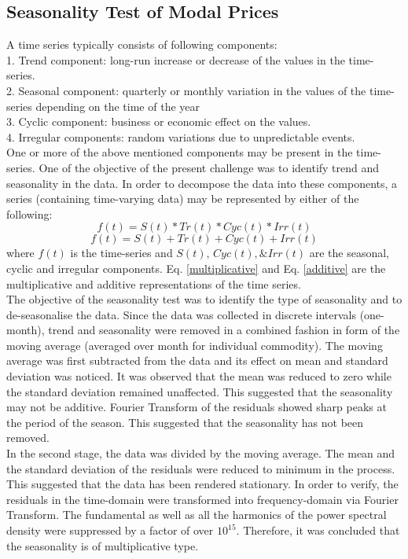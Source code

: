\documentclass{article}
\begin{document}
\subsection{Seasonality Test of Modal Prices}
A time series typically consists of following components: \\
1. Trend component: long-run increase or decrease of the values in the time-series. \\
2. Seasonal component: quarterly or monthly variation in the values of the time-series depending on the time of the year \\
3. Cyclic component: business or economic effect on the values.  \\
4. Irregular components: random variations due to unpredictable events. \\
One or more of the above mentioned components may be present in the time-series. One of the objective of the present challenge was to identify trend and seasonality in the data. In order to decompose the data into these components, a series (containing time-varying data) may be represented by either of the following: \\
\begin{equation}\label{multiplicative}
    f(t) = S(t)*Tr(t)*Cyc(t)*Irr(t)
\end{equation}
\begin{equation} \label{additive}
    f(t) = S(t)+Tr(t)+Cyc(t)+Irr(t)
\end{equation}
where $f(t)$ is the time-series and $S(t), \, Cyc(t), \& Irr(t)$ are the seasonal, cyclic and irregular components. Eq. \ref{multiplicative} and Eq. \ref{additive} are the multiplicative and additive representations of the time series. \\
The objective of the seasonality test was to identify the type of seasonality and to de-seasonalise the data. Since the data was collected in discrete intervals (one-month), trend and seasonality were removed in a combined fashion in form of the moving average (averaged over month for individual commodity). The moving average was first subtracted from the data and its effect on mean and standard deviation was noticed. It was observed that the mean was reduced to zero while the standard deviation remained unaffected. This suggested that the seasonality may not be additive. Fourier Transform of the residuals showed sharp peaks at the period of the season. This suggested that the seasonality has not been removed. \\
In the second stage, the data was divided by the moving average. The mean and the standard deviation of the residuals were reduced to minimum in the process. This suggested that the data has been rendered stationary. In order to verify, the residuals in the time-domain were transformed into frequency-domain via Fourier Transform. The fundamental as well as all the harmonics of the power spectral density were suppressed by a factor of over $10^{15}$. Therefore, it was concluded that the seasonality is of multiplicative type.
\end{document}
